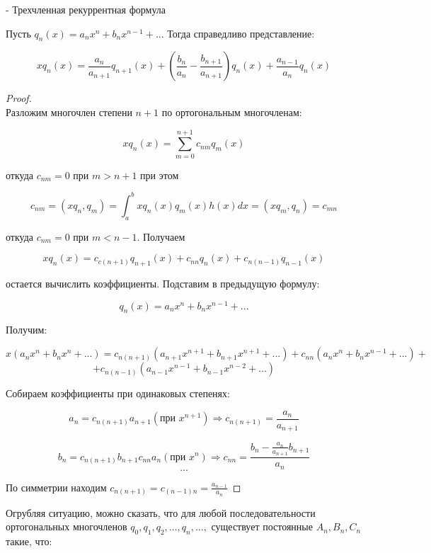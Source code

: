 \documentclass[12pt, a4paper]{report}
\begin{document}
\fi


- Трехчленная рекуррентная формула 

Пусть \( q_n( x ) = a_n x^n + b_n x^{n -1} + ...    \) Тогда справедливо представление: 

\[ x q_n(x ) = \frac{a_n }{a_{n+1 }} q_{n+1 }  (x ) + \left( \frac{b_n }{a_n } - \frac{b_{n+1 } }{a_{n +1 } }   \right)q_n(x ) + \frac{a_{n -1 } }{a_n }q_n(x )   \] 

\begin{proof}
    \[  \] 
    Разложим многочлен степени \( n+1  \) по ортогональным многочленам: 

    \[ x q_n (x ) = \sum_{m =0 }^{n +1 } c_{n m } q_m (x ) \] 
    
    откуда \( c_{nm } = 0  \) при \( m>n +1  \) при этом 
    
    \[ c_{ nm }  = (x q_n , q_m ) = \int_{a }^{b } x q_n (x ) q_m (x ) h(x )dx = (x q_m , q_n ) = c_{mn }    \] 
    
    откуда \( c_{nm } = 0  \) при \( m < n-1  \). Получаем 
    
    \[ x q_n (x ) = c_{c ( n+1 )}   q_{ n+1 }  (x ) + c_{nn }  q_n (x ) + c_{n (n -1 )}     q_{n - 1 }  (x )  \] 
    
    остается вычислить коэффициенты. Подставим в предыдущую формулу: 
    
    \[ q_n (x  ) = a_n x^n   + b_n x^{ n -1 } +... \] 
    
    Получим: 
    
    \[ x(a_n x^n + b_n x^n + ... )= c_{n (n +1 )}  (a_{n+1 } x^{n+1 } + b_{n+1 } x^{n +1 } +...      )+ c_{nn } (a_n x^n + b_n x^{n-1}  + ... ) + \] 
    \[ +c_{n (n-1 )} (a_{n-1 } x^{n-1 } + b_{n-1} x^{n-2 } +... ) \] 
    
    Собираем коэффициенты при одинаковых степенях: 
    
    \[ a_n = c_{n (n +1 )}  a_{n+1 } (\text{при } x^{n+1 }) \Rightarrow c_{n (n+1 )}    = \frac{a_n }{a_{n+1} }   \]  
    
    \[ b_n = c_{n (n +1 )} b_{n +1 } c_{nn   } a_n (\text{при } x^n ) \Rightarrow c_{nn } = \frac{b_n -\frac{a_n }{a_{n+1}  }b_{n+1}     }{a_n}    \] 
    \[ ... \] 
    
    По симметрии находим \( \displaystyle  c_{n(n +1)}   = c_{(n-1 )n}     = \frac{a_{n- 1 } }{a_n} \) 

\end{proof}

Огрубляя ситуацию, можно сказать, что для любой последовательности ортогональных многочленов \( q_0 ,q_1 ,q_2, \ldots, q_n, \ldots,  \) существует постоянные \( A_n , B_n ,C_n  \) такие, что: 
\end{document}
